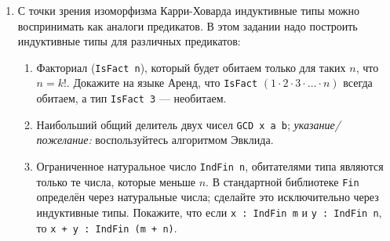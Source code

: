 \documentclass[10pt,a4paper,oneside]{article}
\begin{document}
\begin{enumerate}
Докажите (везде предполагается, что $a,b,c : \texttt{Nat}$, если не указано иного):
\begin{enumerate}
\item $a \preceq b$ тогда и только тогда, когда $a$ меньше или равно $b$ в смысле натуральных чисел (здесь требуется рассуждение
на мета-языке).
\item $a \preceq a + b + 1$; то есть, определите функцию\\\verb!\func n-less-sum (a b : Nat) : NatLessEq a (a Nat.+ suc b)!
\item Если $a \preceq b$, то $a + c \preceq b + c$
\item Если $a \preceq b$ и $c \preceq d$, то $a \cdot c \preceq b \cdot d$
\item $a \preceq 2^a$
\item Транзитивность: если $a \preceq b$ и $b \preceq c$, то $a \preceq c$
\item $a \preceq b \vee b \preceq a$
\item Найдите стандартное определение отношения <<меньше>> в библиотеке Аренда (\verb!Nat.<!) и докажите, что $a \preceq b$ 
тогда и только тогда, когда $a < b$ или $a = b$ (реализуйте функции \\\verb!there (p : NatLessEq a b) : Data.Or (a Nat.< b) (a = b)!
и обратную к ней).
\item Покажите, что $a \preceq b$ тогда и только тогда, когда $\exists k^{\mathbb{N}_0}.a + k = b$.
\end{enumerate}

\item С точки зрения изоморфизма Карри-Ховарда индуктивные типы можно воспринимать как аналоги предикатов.
В этом задании надо построить индуктивные типы для различных предикатов:
\begin{enumerate}
\item Факториал (\verb!IsFact n!), который будет обитаем только для таких $n$, что $n = k!$.
Докажите на языке Аренд, что \verb!IsFact! $(1 \cdot 2 \cdot 3 \cdot \dots \cdot n)$ всегда обитаем, а
тип \verb!IsFact 3! --- необитаем.
\item Наибольший общий делитель двух чисел \verb!GCD x a b!; \emph{указание/пожелание:} воспользуйтесь алгоритмом Эвклида.  
\item Ограниченное натуральное число \verb!IndFin n!, обитателями типа являются только те числа, которые меньше $n$.
В стандартной библиотеке \verb!Fin! определён через натуральные числа; 
сделайте это исключительно через индуктивные типы. Покажите, что если \verb!x : IndFin m! и \verb!y : IndFin n!,
то \verb!x + y : IndFin (m + n)!.
\end{enumerate}


\end{enumerate}
\end{document}
